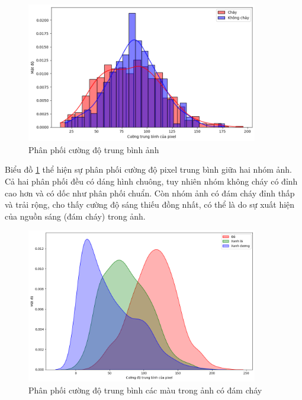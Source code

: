     \begin{figure}[htp]
        \centering
        \includegraphics[width=0.90\textwidth]{images/Img_fire_gray_intensity.png}
        \caption{Phân phối cường độ trung bình ảnh}
        \label{fig:Img_fire_gray_intensity}
    \end{figure}
    \FloatBarrier

     Biểu đồ \ref{fig:Img_fire_gray_intensity} thể hiện sự phân phối cường độ pixel trung bình giữa hai nhóm ảnh. Cả hai phân phối đều có dáng hình chuông, tuy nhiên nhóm không cháy có đỉnh cao hơn và có dốc như phân phối chuẩn. Còn nhóm ảnh có đám cháy đỉnh thấp và trải rộng, cho thấy cường độ sáng thiếu đồng nhất, có thể là do sự xuất hiện của nguồn sáng (đám cháy) trong ảnh.

     \begin{figure}[htp]
        \centering
        \includegraphics[width=0.90\textwidth]{images/Img_fire_rgb_intensity_fire.png}
        \caption{Phân phối cường độ trung bình các màu trong ảnh có đám cháy}
        \label{fig:Img_fire_rgb_intensity_fire}
    \end{figure}
    \FloatBarrier

